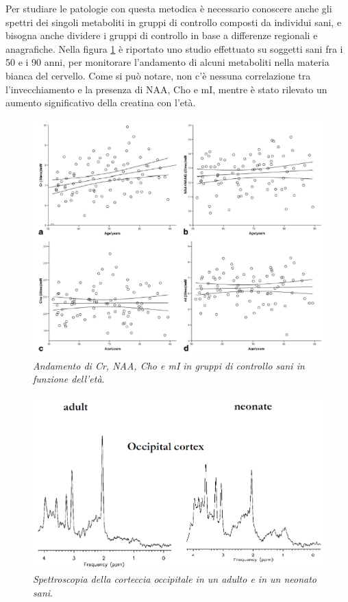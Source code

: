 \documentclass{report}
\newcommand{\figref}[1]{figura \ref{#1}}
\numberwithin{equation}{section}
\numberwithin{figure}{section}
\begin{document}
Per studiare le patologie con questa metodica è necessario conoscere anche gli spettri dei singoli metaboliti in gruppi di controllo composti da individui sani, e bisogna anche dividere i gruppi di controllo in base a differenze regionali e anagrafiche. Nella \figref{fig:controllo} è riportato uno studio effettuato su soggetti sani fra i 50 e i 90 anni, per monitorare l'andamento di alcuni metaboliti nella materia bianca del cervello. Come si può notare, non c'è nessuna correlazione tra l'invecchiamento e la presenza di NAA, Cho e mI, mentre è stato rilevato un aumento significativo della creatina con l'età.

\begin{figure}[htp]
\centering
\includegraphics[scale=0.72]{immagini/controllo.png}
\caption{\label{fig:controllo} \textit{Andamento di Cr, NAA, Cho e mI in gruppi di controllo sani in funzione dell'età}.}
\end{figure}

\begin{figure}[htp]
\centering
\includegraphics[scale=0.55]{immagini/controllo2.png}
\caption{\label{fig:controllo2} \textit{Spettroscopia della corteccia occipitale in un adulto e in un neonato sani}.}
\end{figure}
\end{document}
